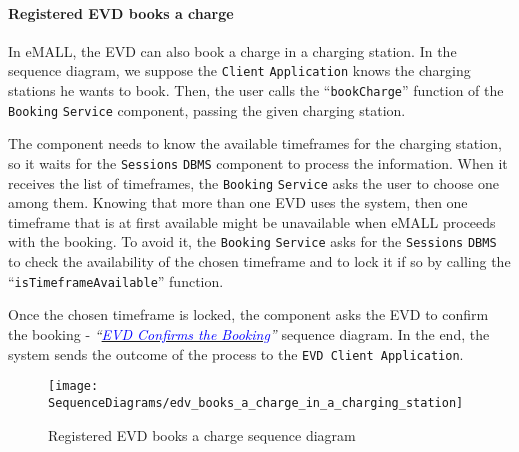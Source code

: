 \paragraph{Registered EVD books a charge}
In eMALL, the EVD can also book a charge in a charging station.
In the sequence diagram, we suppose the \verb|Client| \verb|Application| knows the charging stations he wants to book.
Then, the user calls the ``\verb|bookCharge|'' function of the \verb|Booking| \verb|Service| component, passing the given charging station.

The component needs to know the available timeframes for the charging station, so it waits for the \verb|Sessions| \verb|DBMS| component to process the information.
When it receives the list of timeframes, the \verb|Booking| \verb|Service| asks the user to choose one among them.
Knowing that more than one EVD uses the system, then one timeframe that is at first available might be unavailable when eMALL proceeds with the booking.
To avoid it, the \verb|Booking| \verb|Service| asks for the \verb|Sessions| \verb|DBMS| to check the availability of the chosen timeframe and to lock it if so by calling the ``\verb|isTimeframeAvailable|'' function.

Once the chosen timeframe is locked, the component asks the EVD to confirm the booking - \textit{``}\hyperlink{evdconfirmsbooking}{\textcolor{blue}{\textit{EVD Confirms the Booking}}}\textit{''} sequence diagram.
In the end, the system sends the outcome of the process to the \verb|EVD Client Application|.
\begin{figure}[H]
    \begin{center}
        \texttt{[image: SequenceDiagrams/edv\_books\_a\_charge\_in\_a\_charging\_station]}
        \caption{Registered EVD books a charge sequence diagram}
        \label{fig:evd_books_charge_charging_station}
    \end{center}
\end{figure}

